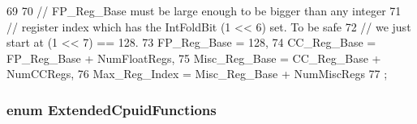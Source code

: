 \begin{DoxyCode}
69                     {
70     // FP_Reg_Base must be large enough to be bigger than any integer
71     // register index which has the IntFoldBit (1 << 6) set.  To be safe
72     // we just start at (1 << 7) == 128.
73     FP_Reg_Base = 128,
74     CC_Reg_Base = FP_Reg_Base + NumFloatRegs,
75     Misc_Reg_Base = CC_Reg_Base + NumCCRegs,
76     Max_Reg_Index = Misc_Reg_Base + NumMiscRegs
77 };
\end{DoxyCode}
\hypertarget{namespaceX86ISA_aae66b7193dbcb57cf0f4894eaec962ca}{
\subsubsection[{ExtendedCpuidFunctions}]{\setlength{\rightskip}{0pt plus 5cm}enum {\bf ExtendedCpuidFunctions}}}
\label{namespaceX86ISA_aae66b7193dbcb57cf0f4894eaec962ca}
